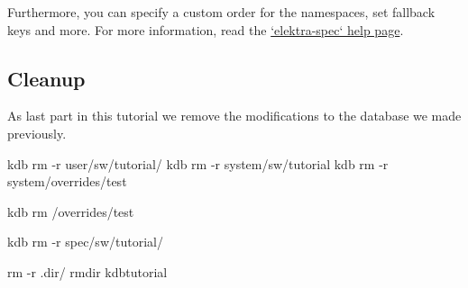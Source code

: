 Furthermore, you can specify a custom order for the namespaces, set fallback keys and more. For more information, read the \hyperlink{md_doc_help_elektra-spec_doc_help_elektra-spec_md}{`elektra-\/spec` help page}.

\subsection*{Cleanup}

As last part in this tutorial we remove the modifications to the database we made previously.


\begin{DoxyCode}
kdb rm -r user/sw/tutorial/
kdb rm -r system/sw/tutorial
kdb rm -r system/overrides/test

kdb rm /overrides/test

kdb rm -r spec/sw/tutorial/

rm -r .dir/
rmdir kdbtutorial
\end{DoxyCode}
 